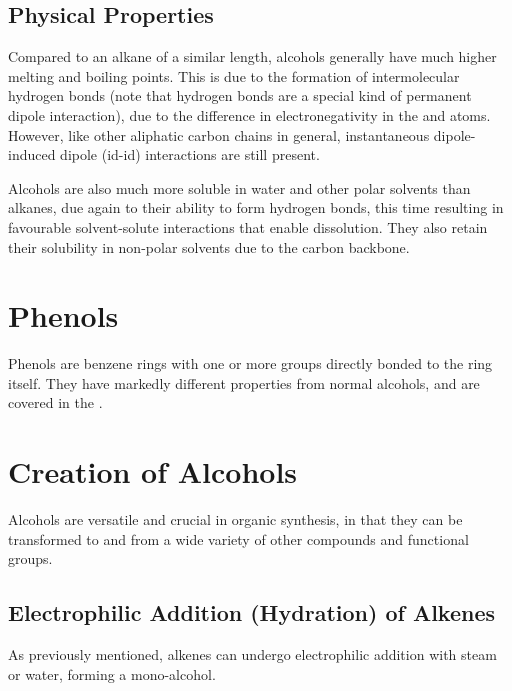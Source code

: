 		\subsection{Physical Properties}

			Compared to an alkane of a similar length, alcohols generally have much higher melting and boiling points. This is due to
			the formation of intermolecular hydrogen bonds (note that hydrogen bonds are a special kind of permanent dipole interaction),
			due to the difference in electronegativity in the  and  atoms. However, like other aliphatic carbon chains in
			general, instantaneous dipole-induced dipole (id-id) interactions are still present.

			Alcohols are also much more soluble in water and other polar solvents than alkanes, due again to their ability to form hydrogen
			bonds, this time resulting in favourable solvent-solute interactions that enable dissolution. They also retain their
			solubility in non-polar solvents due to the carbon backbone.


	\pagebreak
	\section{Phenols}

		Phenols are benzene rings with one or more  groups directly bonded to the ring itself. They have markedly different properties
		from normal alcohols, and are covered in the \hyperlink{ChapterPhenols}{}.




	\section{Creation of Alcohols}

		Alcohols are versatile and crucial in organic synthesis, in that they can be transformed to and from a wide variety of other
		compounds and functional groups.

		\subsection{Electrophilic Addition (Hydration) of Alkenes}

			As previously mentioned, alkenes can undergo electrophilic addition with steam or water, forming a mono-alcohol.


